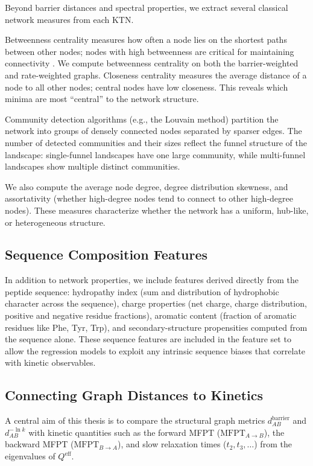 Beyond barrier distances and spectral properties, we extract several classical network
measures from each KTN.

Betweenness centrality measures how often a node lies on the shortest paths between
other nodes; nodes with high betweenness are critical for maintaining connectivity
\cite{Newman2006Modularity}. We compute betweenness centrality on both the
barrier-weighted and rate-weighted graphs. Closeness centrality measures the average
distance of a node to all other nodes; central nodes have low closeness. This reveals
which minima are most ``central'' to the network structure.

Community detection algorithms (e.g., the Louvain method) partition the network into
groups of densely connected nodes separated by sparser edges. The number of detected
communities and their sizes reflect the funnel structure of the landscape: single-funnel
landscapes have one large community, while multi-funnel landscapes show multiple
distinct communities.

We also compute the average node degree, degree distribution skewness, and assortativity
(whether high-degree nodes tend to connect to other high-degree nodes). These measures
characterize whether the network has a uniform, hub-like, or heterogeneous structure.


\subsection{Sequence Composition Features}\label{subsec:sequence-features}

In addition to network properties, we include features derived directly from the
peptide sequence: hydropathy index (sum and distribution of hydrophobic character
across the sequence), charge properties (net charge, charge distribution, positive and
negative residue fractions), aromatic content (fraction of aromatic residues like Phe,
Tyr, Trp), and secondary-structure propensities computed from the sequence alone.
These sequence features are included in the feature set to allow the regression models
to exploit any intrinsic sequence biases that correlate with kinetic observables.


\subsection{Connecting Graph Distances to Kinetics}\label{subsec:connecting}

A central aim of this thesis is to compare the structural graph metrics
$d^{\mathrm{barrier}}_{AB}$ and $d^{-\ln k}_{AB}$ with kinetic quantities such as the
forward MFPT ($\mathrm{MFPT}_{A\to B}$), the backward MFPT ($\mathrm{MFPT}_{B\to A}$),
and slow relaxation times ($t_2, t_3, \ldots$) from the eigenvalues of
$Q^{\mathrm{eff}}$.

